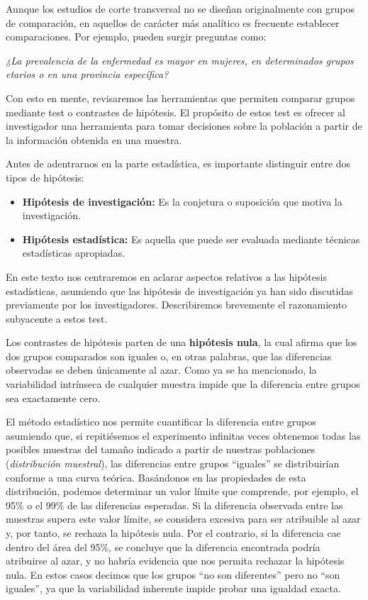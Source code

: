 \documentclass[
  spanish,
  a4paper,
]{scrbook}
\begin{document}
Aunque los estudios de corte transversal no se diseñan originalmente con
grupos de comparación, en aquellos de carácter más analítico es
frecuente establecer comparaciones. Por ejemplo, pueden surgir preguntas
como:

\emph{¿La prevalencia de la enfermedad es mayor en mujeres, en
determinados grupos etarios o en una provincia específica?}

Con esto en mente, revisaremos las herramientas que permiten comparar
grupos mediante test o contrastes de hipótesis. El propósito de estos
test es ofrecer al investigador una herramienta para tomar decisiones
sobre la población a partir de la información obtenida en una muestra.

Antes de adentrarnos en la parte estadística, es importante distinguir
entre dos tipos de hipótesis:

\begin{itemize}
\item
  \textbf{Hipótesis de investigación:} Es la conjetura o suposición que
  motiva la investigación.
\item
  \textbf{Hipótesis estadística:} Es aquella que puede ser evaluada
  mediante técnicas estadísticas apropiadas.
\end{itemize}

En este texto nos centraremos en aclarar aspectos relativos a las
hipótesis estadísticas, asumiendo que las hipótesis de investigación ya
han sido discutidas previamente por los investigadores. Describiremos
brevemente el razonamiento subyacente a estos test.

Los contrastes de hipótesis parten de una \textbf{hipótesis nula}, la
cual afirma que los dos grupos comparados son iguales o, en otras
palabras, que las diferencias observadas se deben únicamente al azar.
Como ya se ha mencionado, la variabilidad intrínseca de cualquier
muestra impide que la diferencia entre grupos sea exactamente cero.

El método estadístico nos permite cuantificar la diferencia entre grupos
asumiendo que, si repitiésemos el experimento infinitas veces obtenemos
todas las posibles muestras del tamaño indicado a partir de nuestras
poblaciones (\emph{distribución muestral}), las diferencias entre grupos
``iguales'' se distribuirían conforme a una curva teórica. Basándonos en
las propiedades de esta distribución, podemos determinar un valor límite
que comprende, por ejemplo, el 95\% o el 99\% de las diferencias
esperadas. Si la diferencia observada entre las muestras supera este
valor límite, se considera excesiva para ser atribuible al azar y, por
tanto, se rechaza la hipótesis nula. Por el contrario, si la diferencia
cae dentro del área del 95\%, se concluye que la diferencia encontrada
podría atribuirse al azar, y no habría evidencia que nos permita
rechazar la hipótesis nula. En estos casos decimos que los grupos ``no
son diferentes'' pero no ``son iguales'', ya que la variabilidad
inherente impide probar una igualdad exacta.
\end{document}
